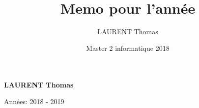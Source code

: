 \documentclass[french, 12pt]{report}
\title{Memo pour l'année}
\author{LAURENT Thomas}
\date{Master 2 informatique 2018}
\begin{document}
\begin{titlepage}
\begin{center}
       \vspace*{1cm}
 
 
       \vspace{0.5cm}
       \scalebox{2}{Master 2 IA}
 
       \vspace{1.5cm}
 
       \textbf{LAURENT Thomas}
 
       \vfill
 
       \vspace{0.8cm}
 
       Années: 2018 - 2019
 
   \end{center}
\end{titlepage}
\pagebreak
\pagebreak
\pagebreak
\tableofcontents







%




\pagebreak
\pagebreak
\end{document}
